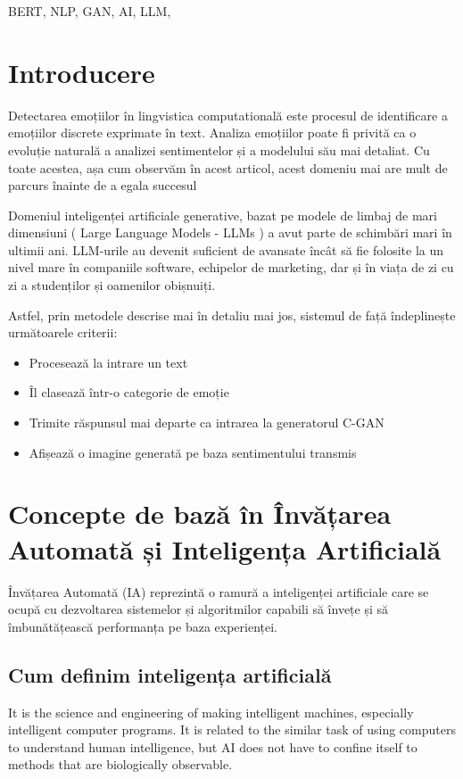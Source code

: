 \documentclass[conference]{IEEEtran}
\begin{document}
\begin{IEEEkeywords}
BERT, NLP, GAN, AI, LLM,
\end{IEEEkeywords}


\section{Introducere}

Detectarea emoțiilor în lingvistica computatională este procesul de identificare a emoțiilor 
discrete exprimate în text. Analiza emoțiilor poate fi privită ca o evoluție naturală a analizei 
sentimentelor și a modelului său mai detaliat. 
Cu toate acestea, așa cum observăm în acest articol, 
acest domeniu mai are mult de parcurs înainte de a egala succesul 


Domeniul inteligenței artificiale generative, bazat pe modele de limbaj de mari dimensiuni 
( Large Language Models - LLMs ) a avut parte de schimbări mari în ultimii ani. 
LLM-urile au devenit suficient de avansate încât să fie folosite la un nivel mare în 
companiile software, echipelor de marketing, dar și în viața de zi cu zi a studenților și oamenilor obișnuiți. 


Astfel, prin metodele descrise mai în detaliu mai jos, sistemul de față îndeplinește următoarele criterii:
\begin{itemize}
	\item Procesează la intrare un text 
	\item Îl clasează într-o categorie de emoție
	\item Trimite răspunsul mai departe ca intrarea la generatorul C-GAN 
	\item Afișează o imagine generată pe baza sentimentului transmis
\end{itemize}


\section{Concepte de bază în Învățarea Automată și Inteligența Artificială}
Învățarea Automată (IA) reprezintă o ramură a inteligenței artificiale care se ocupă cu dezvoltarea sistemelor și 
algoritmilor capabili să învețe și să îmbunătățească performanța pe baza experienței.

\subsection{Cum definim inteligența artificială}
It is the science and engineering of making intelligent machines, especially intelligent computer programs. It is related to the similar task of using computers to understand human intelligence, but AI does not have to confine itself to methods that are biologically observable.
\end{document}
